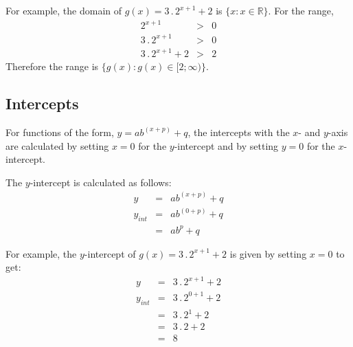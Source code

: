 For example, the domain of $g(x)=3\,.\, 2^{x+1} + 2$ is $\{x:x\in\mathbb{R}\}$.
For the range,
\begin{eqnarray*}
2^{x+1}&>&0\\
3 \,.\, 2^{x+1}&>&0\\
3 \,.\, 2^{x+1}+2&>&2
\end{eqnarray*}
Therefore the range is $\{g(x):g(x)\in[2;\infty)\}$.


\subsection{Intercepts}
For functions of the form, $y=ab^{(x+p)} + q$, the intercepts with the $x$- and $y$-axis are calculated by setting $x=0$ for the $y$-intercept and by setting $y=0$ for the $x$-intercept.

The $y$-intercept is calculated as follows:
\begin{eqnarray}
y&=&ab^{(x+p)} + q\\
y_{int}&=&ab^{(0+p)} + q\\
&=&ab^p + q
\end{eqnarray}

For example, the $y$-intercept of $g(x)=3\,.\, 2^{x+1} + 2$ is given by setting $x=0$ to get:
\begin{eqnarray*}
y&=&3\,.\, 2^{x+1} + 2\\
y_{int}&=&3\,.\, 2^{0+1} + 2\\
&=&3\,.\, 2^{1} + 2\\
&=&3 \,.\, 2 + 2\\
&=&8\\
\end{eqnarray*}

